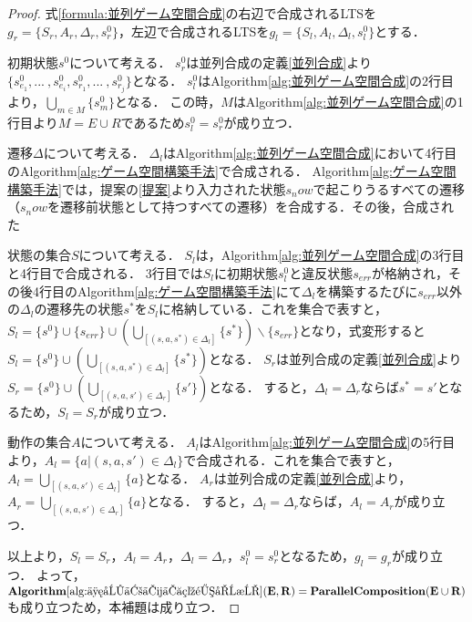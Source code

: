 \begin{proof}
    式\ref{formula:並列ゲーム空間合成}の右辺で合成されるLTSを$g_{r} = \{S_{r},A_{r},\Delta_{r},s^0_{r}\}$，左辺で合成されるLTSを$g_{l} = \{S_{l},A_{l},\Delta_{l},s^0_{l}\}$とする．

    初期状態$s^0$について考える．
    $s^0_{r}$は並列合成の定義\ref{並列合成}より$\{s^0_{e_1}, ... \:, s^0_{e_i}, s^0_{r_1}, ...\:, s^0_{r_j}\}$となる．
    $s^0_{l}$はAlgorithm\ref{alg:並列ゲーム空間合成}の2行目より，$\bigcup_{m \in M} \{s^0_m\}$となる．
    この時，$M$はAlgorithm\ref{alg:並列ゲーム空間合成}の1行目より$M = E \cup R$であるため$s^0_{l} = s^0_{r}$が成り立つ．

    遷移$\Delta$について考える．
    $\Delta_{l}$はAlgorithm\ref{alg:並列ゲーム空間合成}において4行目のAlgorithm\ref{alg:ゲーム空間構築手法}で合成される．
    Algorithm\ref{alg:ゲーム空間構築手法}では，提案の\ref{提案}より入力された状態$s_now$で起こりうるすべての遷移（$s_now$を遷移前状態として持つすべての遷移）を合成する．その後，合成された



    状態の集合$S$について考える．
    $S_{l}$は，Algorithm\ref{alg:並列ゲーム空間合成}の3行目と4行目で合成される．
    3行目では$S_{l}$に初期状態$s^0_{l}$と違反状態$s_{err}$が格納され，その後4行目のAlgorithm\ref{alg:ゲーム空間構築手法}にて$\Delta_{l}$を構築するたびに$s_{err}$以外の$\Delta_{l}$の遷移先の状態$s^*$を$S_{l}$に格納している．これを集合で表すと，$S_{l} = \{s^0\} \cup \{s_{err}\} \cup (\bigcup_{[(s,a,s^*) \in \Delta_{l}]} \{s^*\}) \backslash \{s_{err}\}$となり，式変形すると$S_{l} = \{s^0\} \cup (\bigcup_{[(s,a,s^*) \in \Delta_{l}]} \{s^*\})$となる．
    $S_{r}$は並列合成の定義\ref{並列合成}より$S_{r} = \{s^0\} \cup (\bigcup_{[(s,a,s') \in \Delta_{r}]} \{s'\})$となる．
    すると，$\Delta_{l} = \Delta_{r}$ならば$s^* = s'$となるため，$S_{l} = S_{r}$が成り立つ．

    動作の集合$A$について考える．
    $A_{l}$はAlgorithm\ref{alg:並列ゲーム空間合成}の5行目より，$A_{l} = \{a | (s,a,s') \in \Delta_{l}\}$で合成される．これを集合で表すと，$A_{l} = \bigcup_{[(s,a,s') \in \Delta_{l}]} \{a\}$となる．
    $A_{r}$は並列合成の定義\ref{並列合成}より，$A_{r} = \bigcup_{[(s,a,s') \in \Delta_{r}]} \{a\}$となる．
    すると，$\Delta_{l} = \Delta_{r}$ならば，$A_{l} = A_{r}$が成り立つ．

    以上より，$S_{l}=S_{r}$，$A_{l}=A_{r}$，$\Delta_{l}=\Delta_{r}$，$s^0_{l}=s^0_{r}$となるため，$g_{l} = g_{r}$が成り立つ．
    よって，${\bf Algorithm \ref{alg:並列ゲーム空間合成}(E, R)} = {\bf Parallel Composition(E \cup R)}$も成り立つため，本補題は成り立つ．
\end{proof}

